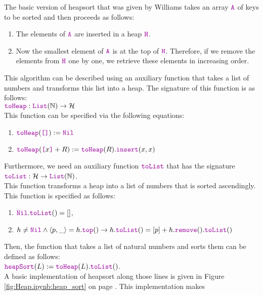 The basic version of heapsort that was given by Williams takes an array $\mytt{A}$ of keys to be sorted and
then proceeds as follows:
\begin{enumerate}
\item The elements of $\mytt{A}$ are inserted in a heap $\mytt{H}$.
\item Now the smallest element of $\mytt{A}$ is at the top of $\mytt{H}$.  Therefore, if we remove the elements
      from $\mytt{H}$ one by one, we retrieve these elements in increasing order.
\end{enumerate}
This algorithm can be described using an auxiliary function  that takes a list of numbers and
transforms this list into a heap.  The signature of this function is as follows:
\\[0.2cm]
\hspace*{1.3cm}
$\mytt{toHeap}: \mytt{List}(\mathbb{N}) \rightarrow \mathcal{H}$
\\[0.2cm]
This function can be specified via the following equations:
\begin{enumerate}
\item $\mytt{toHeap}(\mytt{[]}) := \mytt{Nil}$
\item $\mytt{toHeap}(\mytt{[}x\mytt{]} + R) := \mytt{toHeap}(R).\mytt{insert}(x, x)$
\end{enumerate}
Furthermore, we need an auxiliary function $\mytt{toList}$ that has the signature
\\[0.2cm]
\hspace*{1.3cm}
$\mytt{toList}: \mathcal{H} \rightarrow \mytt{List}(\mathbb{N})$.
\\[0.2cm]
This function transforms a heap into a list of numbers that is sorted ascendingly.  This function is specified as
follows:
\begin{enumerate}
\item $\mytt{Nil}.\mytt{toList}() = []$,
\item $h \not= \mytt{Nil} \wedge \langle p, \_ \rangle = h.\mytt{top}() \rightarrow h.\mytt{toList}() = [p] + h.\mytt{remove}().\mytt{toList}()$
\end{enumerate}
Then, the function  that takes a list of natural numbers and sorts them can be defined as follows:
\\[0.2cm]
\hspace*{1.3cm}
$\mytt{heapSort}(L) := \mytt{toHeap}(L).\mytt{toList}()$.
\\[0.2cm]
A basic implementation of heapsort along those lines is given in Figure
\ref{fig:Heap.ipynb:heap_sort} on page \pageref{fig:Heap.ipynb:heap_sort}.  This implementation makes 
